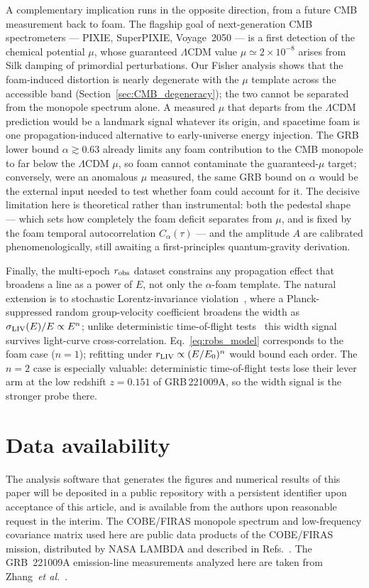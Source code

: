 \documentclass[aps,prd,onecolumn,amsmath,amssymb]{revtex4-2}
\begin{document}
A complementary implication runs in the opposite direction, from a
future CMB measurement back to foam.  The
flagship goal of next-generation CMB spectrometers --- PIXIE,
SuperPIXIE, Voyage~2050 --- is a first detection of the chemical
potential $\mu$, whose guaranteed $\Lambda$CDM value
$\mu\simeq2\times10^{-8}$ arises from Silk damping of primordial
perturbations.  Our Fisher analysis shows that the foam-induced
distortion is nearly degenerate with the $\mu$ template across the
accessible band (Section~\ref{sec:CMB_degeneracy}); the two cannot be
separated from the monopole spectrum alone.  A measured $\mu$ that
departs from the $\Lambda$CDM prediction would be a landmark
signal whatever its origin, and spacetime foam is one
propagation-induced alternative to early-universe energy injection.
The GRB lower bound
$\alpha\gtrsim0.63$ already limits any foam contribution to the CMB
monopole to far below the $\Lambda$CDM $\mu$, so foam cannot
contaminate the guaranteed-$\mu$ target; conversely, were an anomalous
$\mu$ measured, the same GRB bound on $\alpha$ would be the external
input needed to test whether foam could account for it.  The decisive
limitation here is
theoretical rather than instrumental: both the pedestal shape --- which
sets how completely the foam deficit separates from $\mu$, and is fixed
by the foam temporal autocorrelation $C_\alpha(\tau)$ --- and the
amplitude $A$ are calibrated phenomenologically, still awaiting a
first-principles quantum-gravity derivation.

Finally, the multi-epoch $r_{\rm obs}$ dataset constrains any propagation
effect that broadens a line as a power of $E$, not only the
$\alpha$-foam template. The natural extension is to stochastic Lorentz-invariance
violation~\cite{AmelinoCamelia2013}, where a Planck-suppressed random
group-velocity coefficient broadens the width as
$\sigma_{\rm LIV}(E)/E\propto E^n$; unlike deterministic time-of-flight
tests~\cite{Fermi2009,LHAASOTeV2023} this width signal survives light-curve
cross-correlation. Eq.~\eqref{eq:robs_model} corresponds to the foam
case ($n=1$); refitting under $r_{\rm LIV}\propto(E/E_0)^n$ would bound
each order.  The $n=2$ case is especially valuable: deterministic
time-of-flight tests lose their lever arm at the low redshift $z=0.151$
of GRB\,221009A, so the width signal is the stronger probe there.

\section*{Data availability}
The analysis software that generates the figures and numerical results of this
paper will be deposited in a public repository with a persistent identifier upon
acceptance of this article, and is available from the authors upon reasonable
request in the interim. The COBE/FIRAS monopole spectrum and low-frequency
covariance matrix used here are public data products of the COBE/FIRAS mission,
distributed by NASA LAMBDA and described in Refs.~\cite{Fixsen1996,Fixsen2009}. The
GRB~221009A emission-line measurements analyzed here are taken from
Zhang~\textit{et al.}~\cite{YQZhang2024}.
\end{document}
